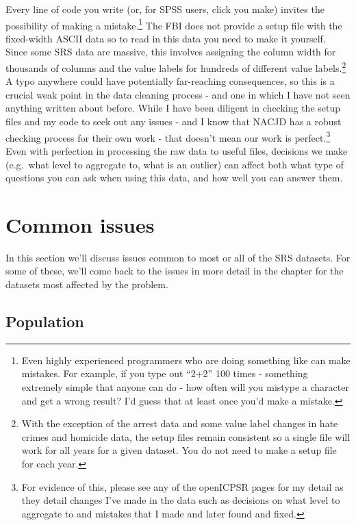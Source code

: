 \documentclass[
]{krantz}
\begin{document}
Every line of code you write (or, for SPSS users, click you
make) invites the possibility of making a
mistake.\footnote{Even highly experienced programmers who
  are doing something like can make mistakes. For example,
  if you type out ``2+2'' 100 times - something extremely
  simple that anyone can do - how often will you mistype a
  character and get a wrong result? I'd guess that at least
  once you'd make a mistake.} The FBI does not provide a
setup file with the fixed-width ASCII data so to read in
this data you need to make it yourself. Since some SRS data
are massive, this involves assigning the column width for
thousands of columns and the value labels for hundreds of
different value labels.\footnote{With the exception of the
  arrest data and some value label changes in hate crimes
  and homicide data, the setup files remain consistent so a
  single file will work for all years for a given dataset.
  You do not need to make a setup file for each year.} A
typo anywhere could have potentially far-reaching
consequences, so this is a crucial weak point in the data
cleaning process - and one in which I have not seen anything
written about before. While I have been diligent in checking
the setup files and my code to seek out any issues - and I
know that NACJD has a robust checking process for their own
work - that doesn't mean our work is perfect.\footnote{For
  evidence of this, please see any of the openICPSR pages
  for my detail as they detail changes I've made in the data
  such as decisions on what level to aggregate to and
  mistakes that I made and later found and fixed.} Even with
perfection in processing the raw data to useful files,
decisions we make (e.g.~what level to aggregate to, what is
an outlier) can affect both what type of questions you can
ask when using this data, and how well you can answer them.

\section{Common issues}\label{common-issues}

In this section we'll discuss issues common to most or all
of the SRS datasets. For some of these, we'll come back to
the issues in more detail in the chapter for the datasets
most affected by the problem.

\subsection{Population}\label{population}
\end{document}
